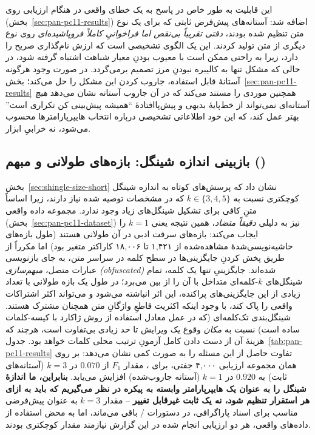 \documentclass[11pt,a4paper]{article}
\begin{document}
	این قابلیت به طور خاص در پاسخ به یک خطای واقعی در هنگام ارزیابی روی  (بخش~\ref{sec:pan-pc11-results}) اضافه شد: آستانه‌های پیش‌فرض ثابتی که برای یک نوع متن تنظیم شده بودند، \emph{دقتی تقریباً بی‌نقص اما فراخوانیِ کاملاً فروپاشیده‌ای} روی نوع دیگری از متن تولید کردند. این یک الگوی تشخیصی است که ارزش نام‌گذاری صریح را دارد، زیرا به راحتی ممکن است با معیوب بودنِ معیار شباهت اشتباه گرفته شود، در حالی که مشکل تنها به کالیبره نبودنِ مرز تصمیم برمی‌گردد. در صورت وجود هرگونه آستانهٔ قابل استفاده، جاروب کردن این مشکل را حل می‌کند؛ بخش~\ref{sec:pan-pc11-results} همچنین موردی را مستند می‌کند که در آن جاروب آستانه نشان می‌دهد \emph{هیچ} آستانه‌ای نمی‌تواند از خط‌پایهٔ بدیهی و پیش‌پاافتادهٔ ``همیشه پیش‌بینی کن تکراری است'' بهتر عمل کند، که این خود اطلاعاتی تشخیصی درباره انتخاب هایپرپارامترها محسوب می‌شود، نه خرابیِ ابزار.
	
	\subsection{بازبینی اندازه شینگل: بازه‌های طولانی و مبهم ()}
	\label{sec:shingle-size-pan}
	
	بخش~\ref{sec:shingle-size-short} نشان داد که پرسش‌های کوتاه به اندازه شینگل کوچکتری نسبت به $k \in \{3,4,5\}$ که در مشخصات توصیه شده نیاز دارند، زیرا اساساً متنِ کافی برای تشکیل شینگل‌های زیاد وجود ندارد. مجموعه داده واقعی  (بخش~\ref{sec:pan-pc11-dataset}) نیز به دلیلی \emph{دقیقاً متضاد}، همین نتیجه یعنی $k=1$ را ایجاب می‌کند: بازه‌های سرقت ادبی در آن طولانی هستند (طول بازه‌های حاشیه‌نویسی‌شدهٔ مشاهده‌شده از ۱,۴۲۱ تا ۱۸,۰۰۶ کاراکتر متغیر بود) اما مکرراً از طریق پخش کردنِ جایگزینی‌ها در سطح کلمه در سراسر متن، به جای بازنویسی عبارات متصل، \emph{مبهم‌سازی (obfuscated)} شده‌اند. جایگزینیِ تنها یک کلمه، تمام شینگل‌های $k$-کلمه‌ای متداخل با آن را از بین می‌برد؛ در طول یک بازه طولانی با تعداد زیادی از این جایگزینی‌های پراکنده، این اثر انباشته می‌شود و می‌تواند اکثر اشتراکات واقعی را پاک کند، با وجود اینکه اکثریت قاطعِ واژگانِ متن همچنان مشترک هستند. شینگل‌بندی تک‌کلمه‌ای (که در عمل معادل استفاده از روش ژاکارد با کیسه-کلمات ساده است) نسبت به \emph{مکان} وقوع یک ویرایش تا حد زیادی بی‌تفاوت است، هرچند که هزینهٔ آن از دست دادن کامل آزمونِ ترتیب محلی کلمات خواهد بود. جدول~\ref{tab:pan-pc11-results} تفاوت حاصل از این مسئله را به صورت کمی نشان می‌دهد: بر روی همان مجموعه ارزیابی ۴,۰۰۰ جفتی، برای ، مقدار $F_1$ از $0.070$ در $k=3$ (آستانه‌های ثابت) به $0.920$ در $k=1$ (آستانه جاروب‌شده) افزایش می‌یابد. \textbf{بنابراین، ما اندازهٔ شینگل را به عنوان یک هایپرپارامتر وابسته به پیکره در نظر می‌گیریم که باید به ازای هر استقرار تنظیم شود، نه یک ثابت غیرقابل تغییر} -- مقدار $k=3$ به عنوان پیش‌فرضی مناسب برای اسناد پاراگرافی، در دستورات / باقی می‌ماند، اما به محض استفاده از داده‌های واقعی، هر دو ارزیابی انجام شده در این گزارش نیازمند مقدار کوچکتری بودند.
	
\end{document}
